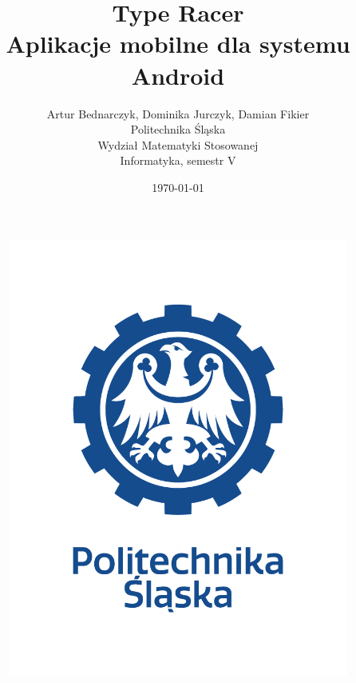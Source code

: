 \documentclass[12pt,a4paper]{article}
\title{Type Racer\\Aplikacje mobilne dla systemu Android}
\author{Artur Bednarczyk, Dominika Jurczyk, Damian Fikier\\Politechnika Śląska\\Wydział Matematyki Stosowanej\\Informatyka, semestr V}
\date{\today}
\begin{document}
	\maketitle
	\begin{figure}[H]
		\centering
		\includegraphics[width=0.5\linewidth]{logo2}
		\label{fig:logo}
	\end{figure}
	\clearpage
	\tableofcontents
	\clearpage
\end{document}
